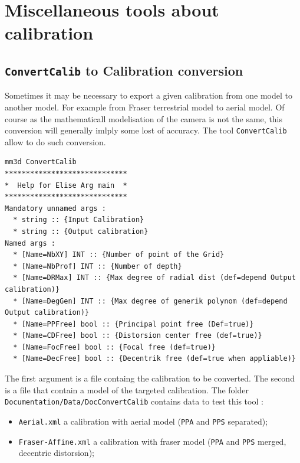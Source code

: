 
\section{Miscellaneous  tools about calibration}


\subsection{{\tt ConvertCalib} to Calibration conversion}

Sometimes it may be necessary to export a given calibration from one model to another model. For example from Fraser terrestrial
model to aerial model. Of course as the mathematicall modelisation of the camera is not the same, this conversion will 
generally imlply some lost of accuracy.  The tool {\tt ConvertCalib} allow to do such conversion.

\begin{verbatim}
mm3d ConvertCalib
*****************************
*  Help for Elise Arg main  *
*****************************
Mandatory unnamed args : 
  * string :: {Input Calibration}
  * string :: {Output calibration}
Named args : 
  * [Name=NbXY] INT :: {Number of point of the Grid}
  * [Name=NbProf] INT :: {Number of depth}
  * [Name=DRMax] INT :: {Max degree of radial dist (def=depend Output calibration)}
  * [Name=DegGen] INT :: {Max degree of generik polynom (def=depend Output calibration)}
  * [Name=PPFree] bool :: {Principal point free (Def=true)}
  * [Name=CDFree] bool :: {Distorsion center free (def=true)}
  * [Name=FocFree] bool :: {Focal free (def=true)}
  * [Name=DecFree] bool :: {Decentrik free (def=true when appliable)}
\end{verbatim}


The first argument is a file containg the calibration to be converted. The second is a file that contain a model of the
targeted calibration. The folder {\tt Documentation/Data/DocConvertCalib} contains data to test this tool :

\begin{itemize}
   \item  {\tt Aerial.xml} a calibration with aerial model ({\tt PPA} and {\tt PPS} separated);
   \item  {\tt Fraser-Affine.xml} a calibration with fraser model ({\tt PPA} and {\tt PPS} merged, decentric distorsion);
\end{itemize}

